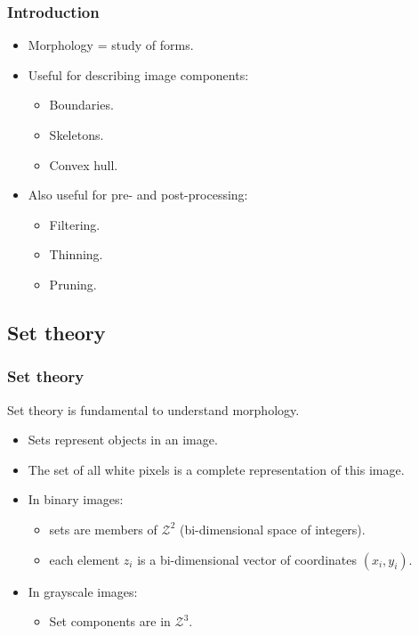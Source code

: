\begin{frame}
\frametitle{Introduction}
\begin{itemize}
\item Morphology = study of forms.
\item Useful for describing image components:
\begin{itemize}
\item Boundaries.
\item Skeletons.
\item Convex hull.
\end{itemize}
\item Also useful for pre- and post-processing:
\begin{itemize}
\item Filtering.
\item Thinning.
\item Pruning.
\end{itemize}
\end{itemize}
\end{frame}

\subsection{Set theory}

\begin{frame}
\frametitle{Set theory}
Set theory is fundamental to understand morphology.
\begin{itemize}
\item Sets represent objects in an image.
\item The set of all white pixels is a complete representation of this image.
\item In binary images:
\begin{itemize}
\item sets are members of $\mathcal{Z}^{2}$ (bi-dimensional space of integers).
\item each element $z_{i}$ is a bi-dimensional vector of coordinates $(x_{i}, y_{i})$.
\end{itemize}
\item In grayscale images:
\begin{itemize}
\item Set components are in $\mathcal{Z}^{3}$.
\end{itemize}
\end{itemize}
\end{frame}

